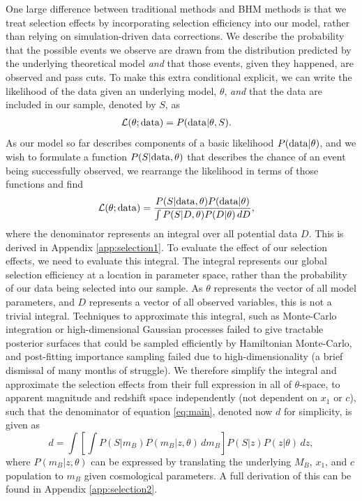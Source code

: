 \documentclass[a4paper,fleqn,usenatbib,manuscript]{emulateapj}
\newcommand{\blue}{\color{blue}}
\begin{document}
One large difference between traditional methods and BHM methods is that we treat selection effects by incorporating selection efficiency into our model, rather than relying on simulation-driven data corrections. We describe the probability that the {\blue possible} events we observe are drawn from the distribution predicted by the underlying theoretical model \textit{and} that those events, given they happened, are observed and pass cuts.  To make this extra conditional explicit, we can write the likelihood of the data given an underlying model, $\theta$, \textit{and} that the data are included in our sample, denoted by $S$, as
\begin{align}
\mathcal{L}(\theta; {\rm data}) &= P({\rm data} | \theta, S). \label{eq:like}
\end{align}
As our model so far describes components of a basic likelihood $P({\rm data}|\theta)$, and we wish to formulate a function $P(S|{\rm data},\theta)$ that describes the chance of an event being successfully observed, we rearrange the likelihood in terms of those functions and find
\begin{align}
\mathcal{L}(\theta; {\rm data}) &= \frac{P(S|{\rm data},\theta) P({\rm data}|\theta)}{\int P(S | D, \theta) P(D|\theta)\, dD}, \label{eq:main}
\end{align}
where the denominator represents an integral over all potential data $D$. This is derived in Appendix \ref{app:selection1}. {\blue To evaluate the effect of our selection effects, we need to evaluate this integral. The integral represents our global selection efficiency at a location in parameter space, rather than the probability of our data being selected into our sample.} As $\theta$ represents the vector of all model parameters, and $D$ represents a vector of all observed variables, this is not a trivial integral. Techniques to approximate this integral, such as Monte-Carlo integration or high-dimensional Gaussian processes failed to give tractable posterior surfaces that could be sampled efficiently by Hamiltonian Monte-Carlo, and post-fitting importance sampling failed due to high-dimensionality (a brief dismissal of many months of struggle). We therefore simplify the integral and approximate the selection effects from their full expression in all of $\theta$-space, to apparent magnitude and redshift space independently (not dependent on $x_1$ or $c$), such that the denominator of equation \eqref{eq:main}, denoted now $d$ for simplicity, is given as
\begin{equation}
d = \int  \left[ \int P(S|m_B) P(m_B | z, \theta)\, d m_B \right] P(S|z) P(z|\theta)\, dz, \label{eq:w1}
\end{equation}
where $P(m_B | z, \theta)$ can be expressed by translating the underlying $M_B$, $x_1$, and $c$ population to $m_B$ given cosmological parameters. A full derivation of this can be found in Appendix \ref{app:selection2}.
\end{document}
